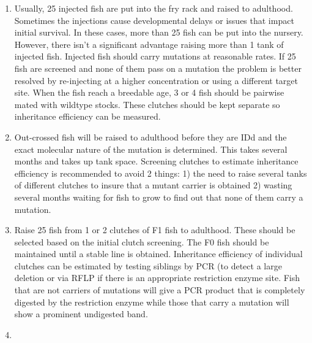 \documentclass[
  letterpaper,
  DIV=11,
  numbers=noendperiod]{scrreprt}
\begin{document}
\begin{tcolorbox}[enhanced jigsaw, rightrule=.15mm, title=\textcolor{quarto-callout-note-color}{\faInfo}\hspace{0.5em}{Notes}, titlerule=0mm, opacitybacktitle=0.6, toprule=.15mm, bottomrule=.15mm, opacityback=0, left=2mm, colframe=quarto-callout-note-color-frame, breakable, coltitle=black, colback=white, colbacktitle=quarto-callout-note-color!10!white, bottomtitle=1mm, leftrule=.75mm, toptitle=1mm, arc=.35mm]

\begin{enumerate}
\def\labelenumi{\arabic{enumi}.}
\item
  Usually, 25 injected fish are put into the fry rack and raised to
  adulthood. Sometimes the injections cause developmental delays or
  issues that impact initial survival. In these cases, more than 25 fish
  can be put into the nursery. However, there isn't a significant
  advantage raising more than 1 tank of injected fish. Injected fish
  should carry mutations at reasonable rates. If 25 fish are screened
  and none of them pass on a mutation the problem is better resolved by
  re-injecting at a higher concentration or using a different target
  site. When the fish reach a breedable age, 3 or 4 fish should be
  pairwise mated with wildtype stocks. These clutches should be kept
  separate so inheritance efficiency can be measured.
\item
  Out-crossed fish will be raised to adulthood before they are IDd and
  the exact molecular nature of the mutation is determined. This takes
  several months and takes up tank space. Screening clutches to estimate
  inheritance efficiency is recommended to avoid 2 things: 1) the need
  to raise several tanks of different clutches to insure that a mutant
  carrier is obtained 2) wasting several months waiting for fish to grow
  to find out that none of them carry a mutation.
\item
  Raise 25 fish from 1 or 2 clutches of F1 fish to adulthood. These
  should be selected based on the initial clutch screening. The F0 fish
  should be maintained until a stable line is obtained. Inheritance
  efficiency of individual clutches can be estimated by testing siblings
  by PCR (to detect a large deletion or via RFLP if there is an
  appropriate restriction enzyme site. Fish that are not carriers of
  mutations will give a PCR product that is completely digested by the
  restriction enzyme while those that carry a mutation will show a
  prominent undigested band.
\item

\end{enumerate}
\end{tcolorbox}
\end{document}
